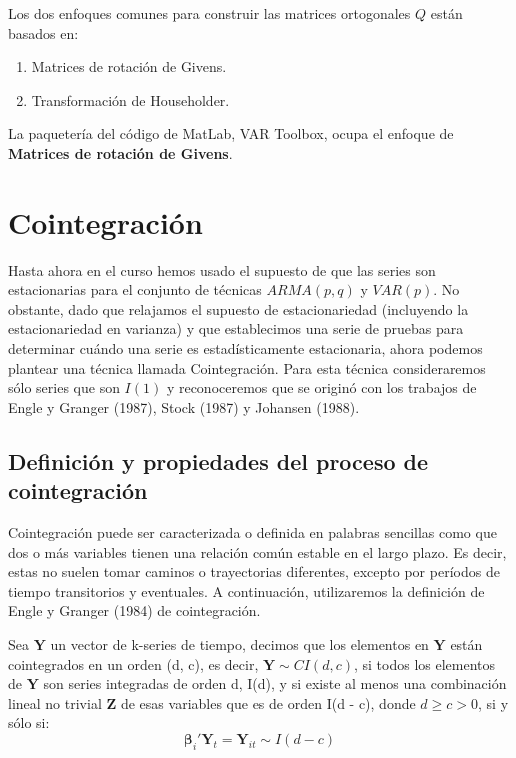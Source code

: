 \documentclass[
]{book}
\begin{document}
Los dos enfoques comunes para construir las matrices ortogonales \(Q\) están basados en:

\begin{enumerate}
\def\labelenumi{\arabic{enumi}.}
\item
  Matrices de rotación de Givens.
\item
  Transformación de Householder.
\end{enumerate}

La paquetería del código de MatLab, VAR Toolbox, ocupa el enfoque de \textbf{Matrices de rotación de Givens}.

\hypertarget{cointegraciuxf3n}{%
\section{Cointegración}\label{cointegraciuxf3n}}

Hasta ahora en el curso hemos usado el supuesto de que las series son
estacionarias para el conjunto de técnicas \(ARMA(p,q)\) y \(VAR(p)\). No
obstante, dado que relajamos el supuesto de estacionariedad (incluyendo
la estacionariedad en varianza) y que establecimos una serie de pruebas
para determinar cuándo una serie es estadísticamente estacionaria, ahora
podemos plantear una técnica llamada Cointegración. Para esta técnica
consideraremos sólo series que son \(I(1)\) y reconoceremos que se originó
con los trabajos de Engle y Granger (1987), Stock (1987) y Johansen
(1988).

\hypertarget{definiciuxf3n-y-propiedades-del-proceso-de-cointegraciuxf3n}{%
\subsection{Definición y propiedades del proceso de cointegración}\label{definiciuxf3n-y-propiedades-del-proceso-de-cointegraciuxf3n}}

Cointegración puede ser caracterizada o definida en palabras sencillas
como que dos o más variables tienen una relación común estable en el
largo plazo. Es decir, estas no suelen tomar caminos o trayectorias
diferentes, excepto por períodos de tiempo transitorios y eventuales. A
continuación, utilizaremos la definición de Engle y Granger (1984) de
cointegración.

Sea \(\mathbf{Y}\) un vector de k-series de tiempo, decimos que los
elementos en \(\mathbf{Y}\) están cointegrados en un orden (d, c), es
decir, \(\mathbf{Y} \sim CI(d, c)\), si todos los elementos de
\(\mathbf{Y}\) son series integradas de orden d, I(d), y si existe al
menos una combinación lineal no trivial \(\mathbf{Z}\) de esas variables
que es de orden I(d - c), donde \(d \geq c > 0\), si y sólo si:
\begin{equation}
    \boldsymbol{\beta}_i' \mathbf{Y}_t = \mathbf{Y}_{it} \sim I(d-c)
\end{equation}
\end{document}
